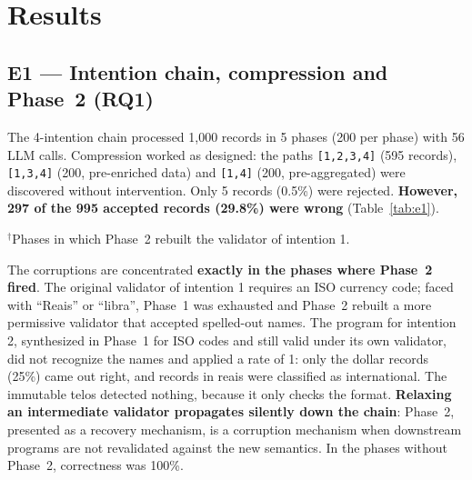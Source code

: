 \documentclass[sigconf,nonacm]{acmart}
\begin{document}
\section{Results}

\subsection{E1 --- Intention chain, compression and Phase~2 (RQ1)}

The 4-intention chain processed 1,000 records in 5 phases (200 per phase) with 56 LLM calls. Compression worked as designed: the paths \texttt{[1,2,3,4]} (595 records), \texttt{[1,3,4]} (200, pre-enriched data) and \texttt{[1,4]} (200, pre-aggregated) were discovered without intervention. Only 5 records (0.5\%) were rejected. \textbf{However, 297 of the 995 accepted records (29.8\%) were wrong} (Table~\ref{tab:e1}).

\begin{table}[h]
\caption{E1 --- 4-intention chain (Opus 4.5, $n=200$ per phase)}
\label{tab:e1}
\end{table}
\noindent $^\dagger$Phases in which Phase~2 rebuilt the validator of intention 1.

The corruptions are concentrated \textbf{exactly in the phases where Phase~2 fired}. The original validator of intention 1 requires an ISO currency code; faced with ``Reais'' or ``libra'', Phase~1 was exhausted and Phase~2 rebuilt a more permissive validator that accepted spelled-out names. The program for intention 2, synthesized in Phase~1 for ISO codes and still valid under its own validator, did not recognize the names and applied a rate of 1: only the dollar records (25\%) came out right, and records in reais were classified as international. The immutable telos detected nothing, because it only checks the format. \textbf{Relaxing an intermediate validator propagates silently down the chain}: Phase~2, presented as a recovery mechanism, is a corruption mechanism when downstream programs are not revalidated against the new semantics. In the phases without Phase~2, correctness was 100\%.
\end{document}
